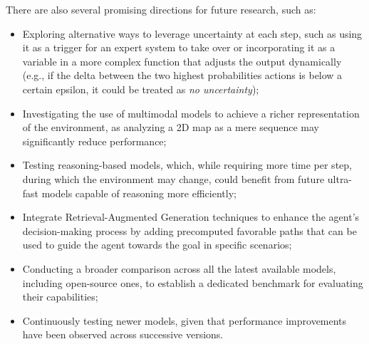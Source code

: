 There are also several promising directions for future research, such as:

\begin{itemize}
  \item Exploring alternative ways to leverage uncertainty at each step, such as
    using it as a trigger for an expert system to take over or incorporating it
    as a variable in a more complex function that adjusts the output dynamically
    (e.g., if the delta between the two highest probabilities actions is below a
    certain epsilon, it could be treated as \emph{no uncertainty});

  \item Investigating the use of multimodal models to achieve a richer representation
    of the environment, as analyzing a 2D map as a mere sequence may
    significantly reduce performance;

  \item Testing reasoning-based models, which, while requiring more time per step,
    during which the environment may change, could benefit from future ultra-fast
    models capable of reasoning more efficiently;

  \item Integrate Retrieval-Augmented Generation techniques to enhance the agent's
    decision-making process by adding precomputed favorable paths that can be used
    to guide the agent towards the goal in specific scenarios;

  \item Conducting a broader comparison across all the latest available models,
    including open-source ones, to establish a dedicated benchmark for evaluating
    their capabilities;

  \item Continuously testing newer models, given that performance improvements
    have been observed across successive versions.
\end{itemize}